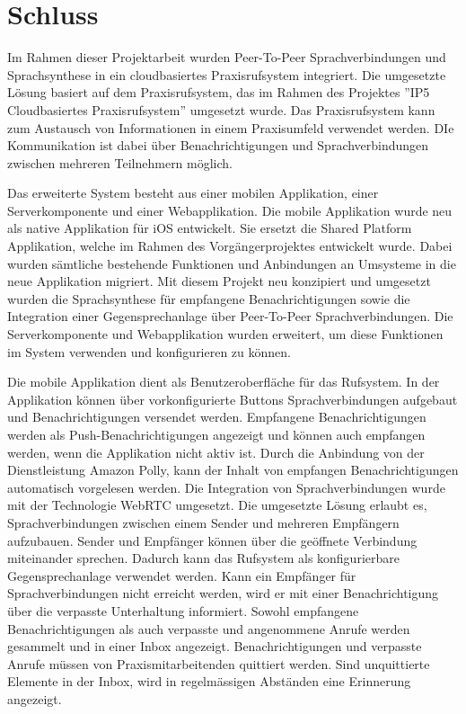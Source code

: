 \section{Schluss}

Im Rahmen dieser Projektarbeit wurden Peer-To-Peer Sprachverbindungen und Sprachsynthese in ein cloudbasiertes Praxisrufsystem integriert.
Die umgesetzte Lösung basiert auf dem Praxisrufsystem, das im Rahmen des Projektes ''IP5 Cloudbasiertes Praxisrufsystem'' umgesetzt wurde.
Das Praxisrufsystem kann zum Austausch von Informationen in einem Praxisumfeld verwendet werden.
DIe Kommunikation ist dabei über Benachrichtigungen und Sprachverbindungen zwischen mehreren Teilnehmern möglich.

Das erweiterte System besteht aus einer mobilen Applikation, einer Serverkomponente und einer Webapplikation.
Die mobile Applikation wurde neu als native Applikation für iOS entwickelt.
Sie ersetzt die Shared Platform Applikation, welche im Rahmen des Vorgängerprojektes entwickelt wurde.
Dabei wurden sämtliche bestehende Funktionen und Anbindungen an Umsysteme in die neue Applikation migriert.
Mit diesem Projekt neu konzipiert und umgesetzt wurden die Sprachsynthese für empfangene Benachrichtigungen sowie die Integration einer Gegensprechanlage über Peer-To-Peer Sprachverbindungen.
Die Serverkomponente und Webapplikation wurden erweitert, um diese Funktionen im System verwenden und konfigurieren zu können.

Die mobile Applikation dient als Benutzeroberfläche für das Rufsystem.
In der Applikation können über vorkonfigurierte Buttons Sprachverbindungen aufgebaut und Benachrichtigungen versendet werden.
Empfangene Benachrichtigungen werden als Push-Benachrichtigungen angezeigt und können auch empfangen werden, wenn die Applikation nicht aktiv ist.
Durch die Anbindung von der Dienstleistung Amazon Polly, kann der Inhalt von empfangen Benachrichtigungen automatisch vorgelesen werden.
Die Integration von Sprachverbindungen wurde mit der Technologie WebRTC umgesetzt.
Die umgesetzte Lösung erlaubt es, Sprachverbindungen zwischen einem Sender und mehreren Empfängern aufzubauen.
Sender und Empfänger können über die geöffnete Verbindung miteinander sprechen.
Dadurch kann das Rufsystem als konfigurierbare Gegensprechanlage verwendet werden.
Kann ein Empfänger für Sprachverbindungen nicht erreicht werden, wird er mit einer Benachrichtigung über die verpasste Unterhaltung informiert.
Sowohl empfangene Benachrichtigungen als auch verpasste und angenommene Anrufe werden gesammelt und in einer Inbox angezeigt.
Benachrichtigungen und verpasste Anrufe müssen von Praxismitarbeitenden quittiert werden.
Sind unquittierte Elemente in der Inbox, wird in regelmässigen Abständen eine Erinnerung angezeigt.

